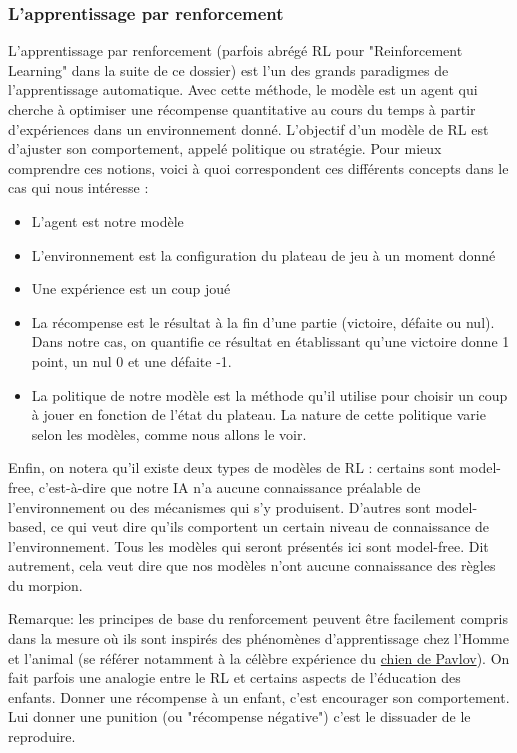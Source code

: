 \documentclass[french]{article}
\begin{document}
    \subsubsection{L'apprentissage par renforcement}
    L'apprentissage par renforcement (parfois abrégé RL pour "Reinforcement Learning" dans la suite de ce dossier) est l'un des grands paradigmes de l'apprentissage automatique. Avec cette méthode, le modèle est un agent qui cherche à optimiser une récompense quantitative au cours du temps à partir d'expériences dans un environnement donné. L'objectif d'un modèle de RL est d'ajuster son comportement, appelé politique ou stratégie. Pour mieux comprendre ces notions, voici à quoi correspondent ces différents concepts dans le cas qui nous intéresse :
    \begin{itemize}
        \item L'agent est notre modèle
        \item L'environnement est la configuration du plateau de jeu à un moment donné
        \item Une expérience est un coup joué 
        \item La récompense est le résultat à la fin d'une partie (victoire, défaite ou nul). Dans notre cas, on quantifie ce résultat en établissant qu'une victoire donne 1 point, un nul 0 et une défaite -1.
        \item La politique de notre modèle est la méthode qu'il utilise pour choisir un coup à jouer en fonction de l'état du plateau. La nature de cette politique varie selon les modèles, comme nous allons le voir.
    \end{itemize}

    Enfin, on notera qu'il existe deux types de modèles de RL : certains sont model-free, c'est-à-dire que notre IA n'a aucune connaissance préalable de l'environnement ou des mécanismes qui s'y produisent. D'autres sont model-based, ce qui veut dire qu'ils comportent un certain niveau de connaissance de l'environnement. Tous les modèles qui seront présentés ici sont model-free. Dit autrement, cela veut dire que nos modèles n'ont aucune connaissance des règles du morpion.
    
    Remarque: les principes de base du renforcement peuvent être facilement compris dans la mesure où ils sont inspirés des phénomènes d'apprentissage chez l'Homme et l'animal (se référer notamment à la célèbre expérience du \href{https://journals.openedition.org/bibnum/604}{chien de Pavlov}). On fait parfois une analogie entre le RL et certains aspects de l'éducation des enfants. Donner une récompense à un enfant, c'est encourager son comportement. Lui donner une punition (ou "récompense négative") c'est le dissuader de le reproduire.
\end{document}
